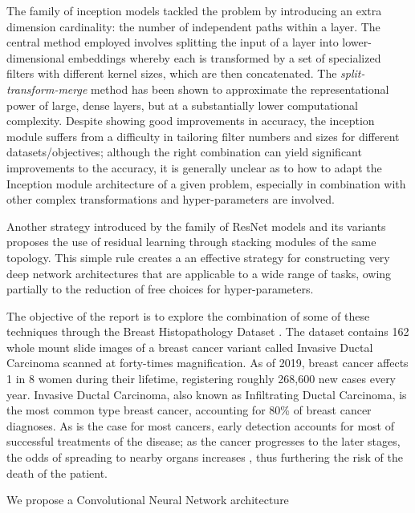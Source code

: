 \documentclass[conference]{IEEEtran}
\begin{document}
The family of inception models \cite{Szegedy2014, Szegedy2015, Szegedy2016} tackled the problem by introducing an extra dimension cardinality: the number of independent paths within a layer. The central method employed involves splitting the input of a layer into lower-dimensional embeddings whereby each is transformed by a set of specialized filters with different kernel sizes, which are then concatenated. The \emph{split-transform-merge} method has been shown to approximate the representational power of large, dense layers, but at a substantially lower computational complexity. Despite showing good improvements in accuracy, the inception module suffers from a difficulty in tailoring filter numbers and sizes for different datasets/objectives; although the right combination can yield significant improvements to the accuracy, it is generally unclear as to how to adapt the Inception module architecture of a given problem, especially in combination with other complex transformations and hyper-parameters are involved.

Another strategy introduced by the family of ResNet models and its variants proposes the use of residual learning through stacking modules of the same topology. This simple rule creates a an effective strategy for constructing very deep network architectures that are applicable to a wide range of tasks, owing partially to the reduction of free choices for hyper-parameters.

The objective of the report is to explore the combination of some of these techniques \cite{Szegedy2014, He2016} through the Breast Histopathology Dataset \cite{Mooney2017}. The dataset contains 162 whole mount slide images of a breast cancer variant called Invasive Ductal Carcinoma scanned at forty-times magnification. As of 2019, breast cancer affects 1 in 8 \cite{DeSantis2019} women during their lifetime, registering roughly 268,600 new cases every year. Invasive Ductal Carcinoma, also known as Infiltrating Ductal Carcinoma, is the most common type breast cancer, accounting for 80\% \cite{Sharma2010} of breast cancer diagnoses. As is the case for most cancers, early detection accounts for most of successful treatments of the disease; as the cancer progresses to the later stages, the odds of spreading to nearby organs increases \cite{Milosevic2018}, thus furthering the risk of the death of the patient.

We propose a Convolutional Neural Network architecture 
\end{document}
